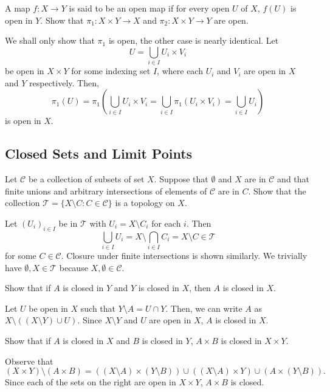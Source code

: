 \begin{exercise}
	A map $f:X\to Y$ is said to be an open map if for every open $U$ of $X$, $f(U)$ is open in $Y$. Show that $\pi_1:X\times Y\to X$ and $\pi_2:X\times Y\to Y$ are open. 
\end{exercise}
\begin{solution*}
	We shall only show that $\pi_1$ is open, the other case is nearly identical. Let
	\[ U = \bigcup_{i\in I} U_i \times V_i \]
	be open in $X\times Y$ for some indexing set $I$, where each $U_i$ and $V_i$ are open in $X$ and $Y$ respectively. Then,
	\[ \pi_1(U) = \pi_1 \left(\bigcup_{i\in I} U_i\times V_i = \bigcup_{i\in I} \pi_1(U_i\times V_i) = \bigcup_{i\in I} U_i \right) \]
	is open in $X$.
\end{solution*}

\setcounter{subsection}{16}
\subsection{Closed Sets and Limit Points}

\begin{exercise}
	Let $\mathcal{C}$ be a collection of subsets of set $X$. Suppose that $\emptyset$ and $X$ are in $\mathcal{C}$ and that finite unions and arbitrary intersections of elements of $\mathcal{C}$ are in $C$. Show that the collection $\mathcal{T}=\{X\setminus C:C\in\mathcal{C}\}$ is a topology on $X$.
\end{exercise}
\begin{solution*}
	Let $(U_i)_{i\in I}$ be in $\mathcal{T}$ with $U_i = X\setminus C_i$ for each $i$. Then
	\[ \bigcup_{i\in I} U_i = X \setminus \bigcap_{i\in I} C_i = X\setminus C \in \mathcal{T} \]
	for some $C\in\mathcal{C}$. Closure under finite intersections is shown similarly. We trivially have $\emptyset,X\in\mathcal{T}$ because $X,\emptyset\in\mathcal{C}$.
\end{solution*}

\begin{exercise}
	Show that if $A$ is closed in $Y$ and $Y$ is closed in $X$, then $A$ is closed in $X$.
\end{exercise}
\begin{solution*}
	Let $U$ be open in $X$ such that $Y\setminus A = U\cap Y$. Then, we can write $A$ as $X\setminus ((X\setminus Y)\cup U)$. Since $X\setminus Y$ and $U$ are open in $X$, $A$ is closed in $X$.
\end{solution*}

\begin{exercise}
	Show that if $A$ is closed in $X$ and $B$ is closed in $Y$, $A\times B$ is closed in $X\times Y$.
\end{exercise}
\begin{solution*}
	Observe that
	\[ (X\times Y) \setminus (A\times B) = ((X\setminus A)\times (Y\setminus B)) \cup ((X\setminus A)\times Y) \cup (A\times (Y\setminus B)). \]
	Since each of the sets on the right are open in $X\times Y$, $A\times B$ is closed.
\end{solution*}

